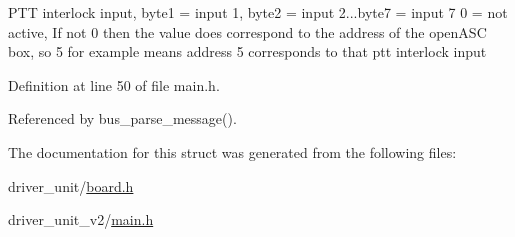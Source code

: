 PTT interlock input, byte1 = input 1, byte2 = input 2...byte7 = input 7 0 = not active, If not 0 then the value does correspond to the address of the openASC box, so 5 for example means address 5 corresponds to that ptt interlock input 

Definition at line 50 of file main.h.

Referenced by bus\_\-parse\_\-message().

The documentation for this struct was generated from the following files:\begin{CompactItemize}
\item 
driver\_\-unit/\hyperlink{driver__unit_2board_8h}{board.h}\item 
driver\_\-unit\_\-v2/\hyperlink{driver__unit__v2_2main_8h}{main.h}\end{CompactItemize}
